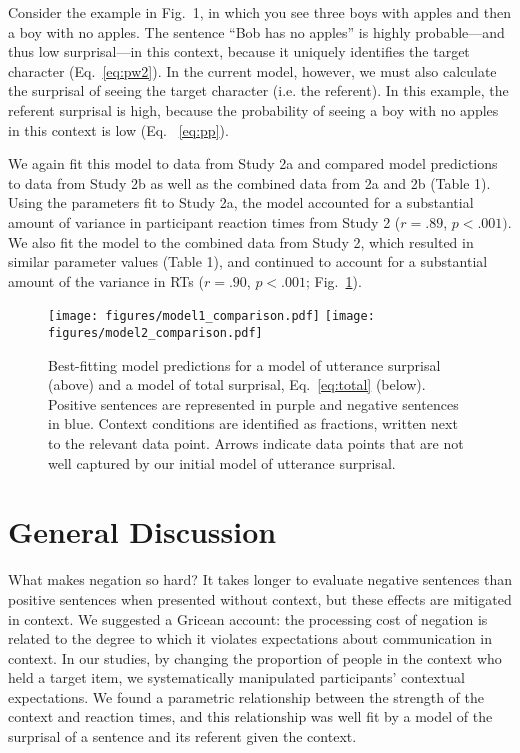 \documentclass[man]{apa2}
\begin{document}
Consider the example in Fig.\ 1, in which you see three boys with apples and then a boy with no apples.  The sentence ``Bob has no apples'' is highly probable---and thus low surprisal---in this context, because it uniquely identifies the target character (Eq.\ \ref{eq:pw2}).  In the current model, however, we must also calculate the surprisal of seeing the target character (i.e. the referent).  In this example, the referent surprisal is high, because the probability of seeing a boy with no apples in this context is low (Eq. \ \ref{eq:pp}).  

We again fit this model to data from Study 2a and compared model predictions to data from Study 2b as well as the combined data from 2a and 2b (Table 1).  Using the parameters fit to Study 2a, the model accounted for a substantial amount of variance in participant reaction times from Study 2 ($r=.89$, $p<.001)$.  We also fit the model to the combined data from Study 2, which resulted in similar parameter values (Table 1), and continued to account for a substantial amount of the variance in RTs ($r=.90$, $p<.001$; Fig.\ \ref{fig:model1_sims}).   

\begin{figure}[t]
\begin{center} 
\texttt{[image: figures/model1\_comparison.pdf]}
\texttt{[image: figures/model2\_comparison.pdf]}
\caption{\label{fig:model1_sims} Best-fitting model predictions for a model of utterance surprisal (above) and a model of total surprisal, Eq.\ \ref{eq:total} (below).  Positive sentences are represented in purple and negative sentences in blue.  Context conditions are identified as fractions, written next to the relevant data point.  Arrows indicate data points that are not well captured by our initial model of utterance surprisal.}
\end{center} 
\end{figure}





\section{General Discussion}

What makes negation so hard? It takes longer to evaluate negative sentences than positive sentences when presented without context, but these effects are mitigated in context. We suggested a Gricean account: the processing cost of negation is related to the degree to which it violates expectations about communication in context. In our studies, by changing the proportion of people in the context who held a target item, we systematically manipulated participants' contextual expectations.  We found a parametric relationship between the strength of the context and reaction times, and this relationship was well fit by a model of the surprisal of a sentence and its referent given the context.
\end{document}
